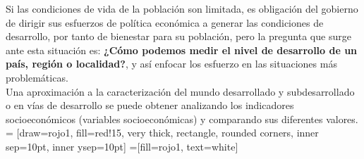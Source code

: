 Si las condiciones de vida de la población son limitada, es obligación del gobierno de dirigir sus esfuerzos de política económica a generar las condiciones de desarrollo, por tanto de bienestar para su población, pero la pregunta que surge ante esta situación es: \textbf{¿Cómo podemos medir el nivel de desarrollo de un país, región o localidad?}, y así enfocar los esfuerzo en las situaciones más problemáticas.\\

Una aproximación a la caracterización del mundo desarrollado y subdesarrollado
o en vías de desarrollo se puede obtener analizando los indicadores
socioeconómicos (\textcolor[rgb]{0,0.25,0.25}{variables socioeconómicas}) y comparando sus diferentes valores.
\\

 = [draw=rojo1, fill=red!15, very thick,
rectangle, rounded corners, inner sep=10pt, inner ysep=10pt]
 =[fill=rojo1, text=white]



